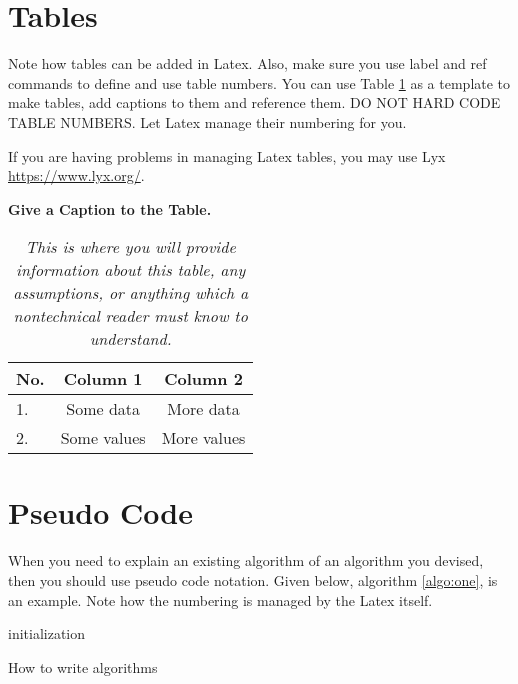 \documentclass{FastFyp}
\begin{document}
\section{Tables}
Note how tables can be added in Latex.  Also, make sure you use label and ref commands to define and use table numbers.  You can use Table \ref{tbl:SomeTable} as a template to make tables, add captions to them and reference them.  DO NOT HARD CODE TABLE NUMBERS.  Let Latex manage their numbering for you.

If you are having problems in managing Latex tables, you may use Lyx \url{https://www.lyx.org/}. 


\begin{table}[hbt]

\begin{center}
\caption{\label{tbl:SomeTable} \textbf{Give a Caption to the Table.}}
\caption*{\textit{This is where you will provide information about this table, any assumptions, or anything which a nontechnical reader must know to understand. }}
\begin{tabular}{|l|c|c|} 
\hline
\textbf{No.}&\textbf{Column 1}&\textbf{Column 2}\\
\hline
1.&Some data&More data\\
\hline
2.&Some values&More values\\
\hline
\end {tabular}

\end{center}

\end{table}

\section{Pseudo Code}
When you need to explain an existing algorithm of an algorithm you devised, then you should use pseudo code notation. Given below, algorithm  \ref{algo:one}, is an example. Note how the numbering is managed by the Latex itself.

\begin{algorithm}[H]
 initialization\;
 \caption{How to write algorithms}
 \label{algo:one}
\end{algorithm}
\end{document}
